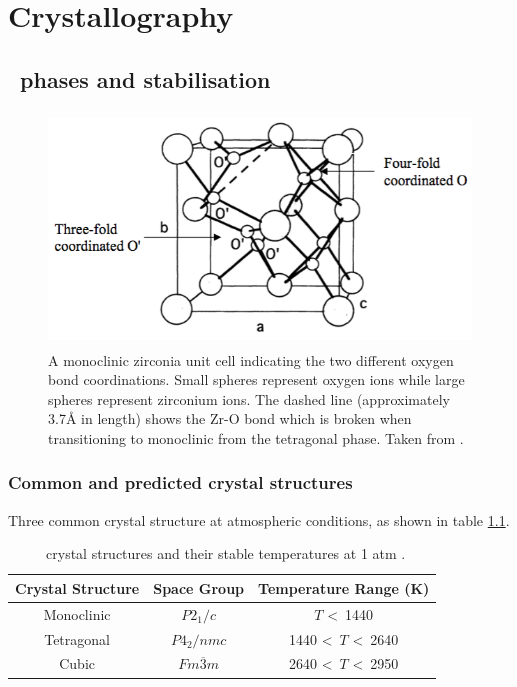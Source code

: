 \chapter{Crystallography}

\label{ch:crystallography}

\section{\zirconia\ phases and stabilisation}

\begin{figure}[htp]
\centering
\includegraphics[height=6.2cm]{images/coordination.png}
\caption{A monoclinic zirconia unit cell indicating the two different oxygen bond coordinations. Small spheres represent oxygen ions while large spheres represent zirconium ions. The dashed line (approximately 3.7\r{A} in length) shows the Zr-O bond which is broken when transitioning to monoclinic from the tetragonal phase. Taken from \cite{Xia2010}.
\label{figure:coordination}}
\end{figure}

\subsection{Common and predicted crystal structures}

Three common crystal structure at atmospheric conditions, as shown in table \ref{table:phases}.

\begin{table}[htp]
\centering
\onehalfspacing
\caption{\zirconia\ crystal structures and their stable temperatures at 1 atm \cite{Howard1988}.}
\label{table:phases}
\begin{tabular}{ccc}
\hline
{Crystal Structure} & {Space Group}    & {Temperature Range (K)} \\ \hline
\multicolumn{1}{c}{Monoclinic} & \multicolumn{1}{c}{$P2_1/c$} & \multicolumn{1}{c}{$T$ \textless\ 1440}     \\
\multicolumn{1}{c}{Tetragonal} & \multicolumn{1}{c}{$P4_2/nmc$} & \multicolumn{1}{c}{1440 \textless\ $T$ \textless\ 2640}        \\
\multicolumn{1}{c}{Cubic} & \multicolumn{1}{c}{$Fm\overline{3}m$}     & \multicolumn{1}{c}{2640 \textless\ $T$ \textless\ 2950}      \\ \hline
\end{tabular}
\end{table}

